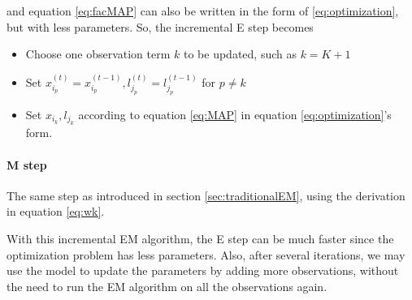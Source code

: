 and equation \ref{eq:facMAP} can also be written in the form of \ref{eq:optimization}, but with less parameters. So, the incremental E step becomes
\begin{itemize}
\item Choose one observation term $k$ to be updated, such as $k = K+1$
\item Set $x_{i_p}^{(t)} = x_{i_p}^{(t-1)}, l_{j_p}^{(t)} = l_{j_p}^{(t-1)}$ for $p \neq k$
\item Set $x_{i_k}, l_{j_k}$ according to equation \ref{eq:MAP} in equation \ref{eq:optimization}'s form.
\end{itemize}
\paragraph{M step} The same step as introduced in section \ref{sec:traditionalEM}, using the derivation in equation \ref{eq:wk}.

With this incremental EM algorithm, the E step can be much faster since the optimization problem has less parameters. Also, after several iterations, we may use the model to update the parameters by adding more observations, without the need to run the EM algorithm on all the observations again.
